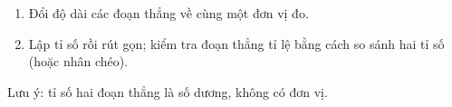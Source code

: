 \begin{enumerate}
\item Đổi độ dài các đoạn thẳng về cùng một đơn vị đo.
\item Lập tỉ số rồi rút gọn; kiểm tra đoạn thẳng tỉ lệ bằng cách so sánh hai tỉ số (hoặc nhân chéo).
\end{enumerate}
Lưu ý: tỉ số hai đoạn thẳng là số dương, không có đơn vị.
